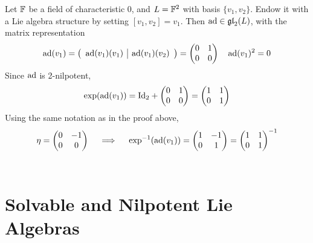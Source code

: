 \documentclass{article}
\begin{document}
\begin{example}
    Let $\mathbb{F}$ be a field of characteristic $0$, and $L = \mathbb{F}^2$ with basis $\{v_1, v_2\}$. Endow it with a Lie algebra structure by setting $[v_1, v_2] = v_1$. Then $\operatorname{ad} \in \mathfrak{gl}_2(L)$, with the matrix representation
    \[
        \operatorname{ad}(v_1) = 
        \left(
        \begin{array}{c|c}
            \operatorname{ad}(v_1)(v_1) & \operatorname{ad}(v_1)(v_2) \\
        \end{array}
        \right)
        = 
        \begin{pmatrix}
            0 & 1 \\
            0 & 0
        \end{pmatrix}
        \quad
        \operatorname{ad}(v_1)^2 = 0
    \]
    Since $\operatorname{ad}$ is 2-nilpotent, 
    \[
        \exp(\operatorname{ad}(v_1)) = \mathrm{Id}_2 + 
        \begin{pmatrix}
            0 & 1 \\
            0 & 0
        \end{pmatrix}
        =
        \begin{pmatrix}
            1 & 1 \\
            0 & 1
        \end{pmatrix}
    \]
    Using the same notation as in the proof above,
    \[
        \eta =
        \begin{pmatrix}
            0 & -1 \\
            0 & 0
        \end{pmatrix}
        \quad \ \Longrightarrow\  \quad
        \exp^{-1}(\operatorname{ad}(v_1)) =
        \begin{pmatrix}
            1 & -1 \\
            0 & 1
        \end{pmatrix}
        =
        \begin{pmatrix}
            1 & 1 \\
            0 & 1
        \end{pmatrix}^{-1}
    \]
    \ 
\end{example}

\section{Solvable and Nilpotent Lie Algebras}
\end{document}
